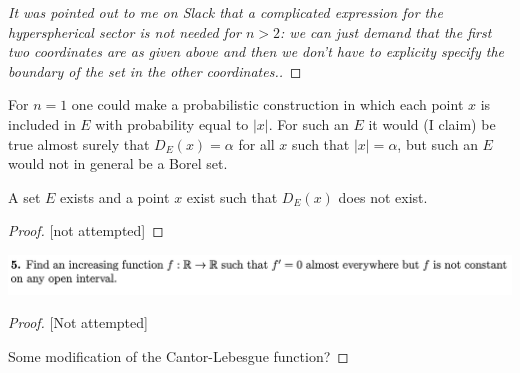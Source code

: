 \begin{enumerate}[label=(\alph*)]
\begin{proof}
    [It was pointed out to me on Slack that a complicated expression for the hyperspherical sector is not
    needed for $n > 2$: we can just demand that the first two coordinates are as given above and then we don't
    have to explicity specify the boundary of the set in the other coordinates.]
  \end{proof}

  \begin{remark*}
    For $n=1$ one could make a probabilistic construction in which each point $x$ is included in $E$ with
    probability equal to $|x|$. For such an $E$ it would (I claim) be true almost surely that $D_E(x) = \alpha$
    for all $x$ such that $|x| = \alpha$, but such an $E$ would not in general be a Borel set.

  \end{remark*}



  \begin{claim*}
     A set $E$ exists and a point $x$ exist such that $D_E(x)$ does not exist.
  \end{claim*}

  \begin{proof}

    [not attempted]
  \end{proof}
\end{enumerate}






\newpage
\begin{mdframed}
\includegraphics[width=400pt]{img/analysis--berkeley-202a-hw12-010d.png}
\end{mdframed}

\begin{proof}

  [Not attempted]

  Some modification of the Cantor-Lebesgue function?
\end{proof}